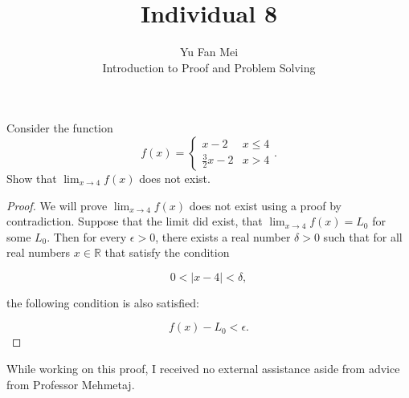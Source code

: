 \documentclass[12pt]{article}
\newenvironment{problem}[2][Problem]{\begin{trivlist}
\item[\hskip \labelsep {\bfseries #1}\hskip \labelsep {\bfseries #2.}]}{\end{trivlist}}
\begin{document}

\title{Individual 8}%
\author{Yu Fan Mei\\
	Introduction to Proof and Problem Solving} %

\maketitle

\begin{problem}{1}
    Consider the function
    \begin{equation*}
    f(x) =
    \begin{cases}
    x - 2 & x \leq 4\\
    \frac{3}{2}x - 2 & x > 4
    \end{cases}.
    \end{equation*}
    Show that $\lim_{x\to 4} f(x)$ does not exist.
\end{problem}

\begin{proof}
    We will prove $\lim_{x\to 4} f(x) $ does not exist using a proof by contradiction. Suppose that the limit did exist, that $\lim_{x\to 4} f(x) = L_0$ for some $L_0$. Then for every $\epsilon > 0$, there exists a real number $\delta > 0$ such that for all real numbers $x \in \mathbb{R}$ that satisfy the condition

    \[0 < |x - 4| < \delta,\]

    the following condition is also satisfied:

    \[ f(x) - L_0 < \epsilon.\]

    

\end{proof}

\noindent While working on this proof, I received no external assistance aside from advice from Professor Mehmetaj.
\end{document}
